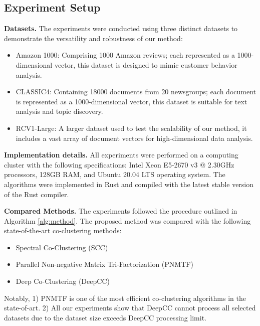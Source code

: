 \subsection{Experiment Setup}

\textbf{Datasets.}
The experiments were conducted using three distinct datasets to demonstrate the versatility and robustness of our method:

\begin{itemize}
    \item Amazon 1000: Comprising 1000 Amazon reviews; each represented as a 1000-dimensional vector, this dataset is designed to mimic customer behavior analysis.
    \item CLASSIC4: Containing 18000 documents from 20 newsgroups; each document is represented as a 1000-dimensional vector, this dataset is suitable for text analysis and topic discovery.
    \item RCV1-Large: A larger dataset used to test the scalability of our method, it includes a vast array of document vectors for high-dimensional data analysis.
\end{itemize}

\textbf{Implementation details.}
All experiments were performed on a computing cluster with the following specifications: Intel Xeon E5-2670 v3 @ 2.30GHz processors, 128GB RAM, and Ubuntu 20.04 LTS operating system. The algorithms were implemented in Rust and compiled with the latest stable version of the Rust compiler. 

\textbf{Compared Methods.}
The experiments followed the procedure outlined in Algorithm \ref{alg:method}. The proposed method was compared with the following state-of-the-art co-clustering methods:

\begin{itemize}
    \item Spectral Co-Clustering (SCC) \cite{dhillon2001CoclusteringDocumentsWords}
    \item Parallel Non-negative Matrix Tri-Factorization (PNMTF)\cite{chen2023ParallelNonNegativeMatrix}
    \item Deep Co-Clustering (DeepCC)\cite{dongkuanxu2019DeepCoClustering}
\end{itemize}

Notably, 1) PNMTF is one of the most efficient co-clustering algorithms in the state-of-art. 2) All our experiments show that DeepCC cannot process all selected datasets due to the dataset size exceeds DeepCC processing limit.

